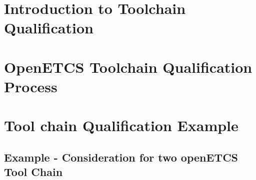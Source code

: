 \documentclass{template/openetcs_report}
\begin{document}
\mainmatter







\chapter{Introduction to Toolchain Qualification}
\label{chap:introduction-and-sota}




\chapter{OpenETCS Toolchain Qualification Process}
\label{chap:qualification-process}


\chapter{Tool chain Qualification Example}
\section{Example - Consideration for two openETCS Tool Chain}





\end{document}
